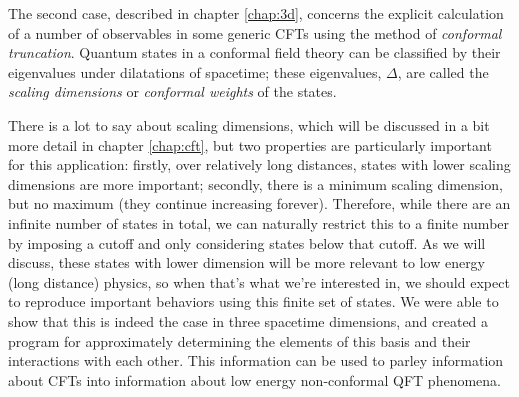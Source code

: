 The second case, described in chapter \ref{chap:3d}, concerns the explicit 
calculation of a number of observables in some generic CFTs using the method of
\emph{conformal truncation}. Quantum states in a conformal field theory can be
classified by their eigenvalues under dilatations of spacetime; these 
eigenvalues, $\Delta$, are called the \emph{scaling dimensions} or 
\emph{conformal weights} of the states.

There is a lot to say about scaling dimensions, which will be discussed in a bit
more detail in chapter \ref{chap:cft}, but two properties are particularly 
important for this application: firstly, over relatively long distances, states 
with lower scaling dimensions are more important; secondly, there is a minimum 
scaling dimension, but no maximum (they continue increasing forever). Therefore, 
while there are an infinite number of states in total, we can naturally restrict 
this to a finite number by imposing a cutoff and only considering states below 
that cutoff. As we will discuss, these states with lower dimension will be more
relevant to low energy (long distance) physics, so when that's what we're 
interested in, we should expect to reproduce important behaviors using this 
finite set of states. We were able to show that this is indeed the case in three
spacetime dimensions, and created a program for approximately determining the 
elements of this basis and their interactions with each other. This information 
can be used to parley information about CFTs into information about low energy 
non-conformal QFT phenomena.

